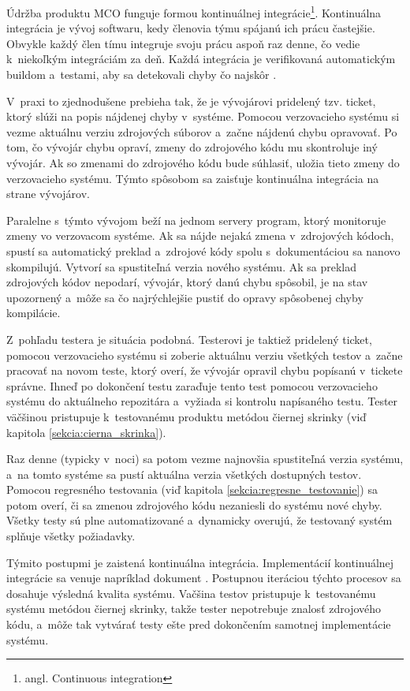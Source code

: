 Údržba produktu MCO funguje formou kontinuálnej integrácie\footnote{angl. Continuous integration}.
Kontinuálna integrácia je vývoj softwaru, kedy členovia týmu spájanú ich prácu častejšie.
Obvykle každý člen tímu integruje svoju prácu aspoň raz denne, čo vedie k~niekoľkým integráciám za deň.
Každá integrácia je verifikovaná automatickým buildom a~testami, aby sa detekovali chyby čo najskôr \cite{Continuous_integration}.

V~praxi to zjednodušene prebieha tak, že je vývojárovi pridelený tzv. ticket, ktorý slúži na popis
nájdenej chyby v~systéme. Pomocou verzovacieho systému si vezme aktuálnu verziu zdrojových súborov a~začne nájdenú chybu opravovať.
Po tom, čo vývojár chybu opraví, zmeny do zdrojového kódu mu skontroluje iný vývojár.
Ak so zmenami do zdrojového kódu bude súhlasiť, uložia tieto zmeny do verzovacieho systému.
Týmto spôsobom sa zaisťuje kontinuálna integrácia na strane vývojárov.

Paralelne s~týmto vývojom beží na jednom servery program, ktorý monitoruje zmeny vo verzovacom systéme.
Ak sa nájde nejaká zmena v~zdrojových kódoch, spustí sa automatický preklad a~zdrojové kódy spolu s~dokumentáciou
sa nanovo skompilujú. Vytvorí sa spustiteľná verzia nového systému. Ak sa preklad zdrojových kódov nepodarí, vývojár, ktorý 
danú chybu spôsobil, je na stav upozornený a~môže sa čo najrýchlejšie pustiť do opravy spôsobenej chyby kompilácie.

Z~pohľadu testera je situácia podobná. Testerovi je taktiež pridelený ticket, pomocou verzovacieho systému si zoberie aktuálnu verziu
všetkých testov a~začne pracovať na novom teste, ktorý overí, že vývojár opravil chybu popísanú v~tickete správne.
Ihneď po dokončení testu zaraďuje tento test pomocou verzovacieho systému do aktuálneho repozitára a~vyžiada si
kontrolu napísaného testu. Tester väčšinou pristupuje k~testovanému produktu metódou čiernej skrinky (viď kapitola \ref{sekcia:cierna_skrinka}).

Raz denne (typicky v~noci) sa potom vezme najnovšia spustiteľná verzia systému, a~na tomto systéme sa pustí aktuálna verzia
všetkých dostupných testov. Pomocou regresného testovania (viď kapitola \ref{sekcia:regresne_testovanie}) sa potom overí, či sa zmenou zdrojového kódu nezaniesli do systému nové
chyby. Všetky testy sú plne automatizované a~dynamicky overujú, že testovaný systém splňuje všetky požiadavky.

Týmito postupmi je zaistená kontinuálna integrácia. Implementácií kontinuálnej integrácie 
sa venuje napríklad dokument \cite{Continuous_integration_implementation}. 
Postupnou iteráciou týchto procesov sa dosahuje výsledná kvalita systému. Vačšina testov pristupuje k~testovanému
systému metódou čiernej skrinky, takže tester nepotrebuje znalosť zdrojového kódu, a~môže tak vytvárať testy
ešte pred dokončením samotnej implementácie systému. 

